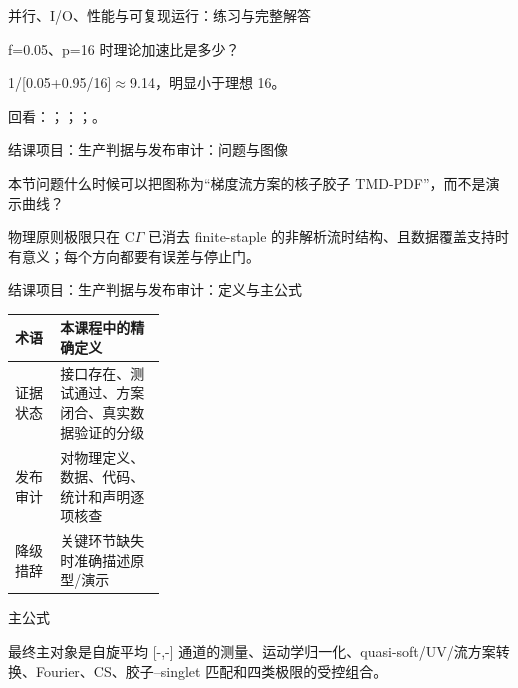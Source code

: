 \begin{frame}[t]{并行、I/\allowbreak{}O、性能与可复现运行：练习与完整解答}
\footnotesize
\begin{block}{}f=0.05、p=16 时理论加速比是多少？\end{block}
\begin{exampleblock}{}1/\allowbreak{}[0.05+0.95/\allowbreak{}16]\ensuremath{\approx}9.14，明显小于理想 16。\end{exampleblock}
\vfill
\scriptsize 回看：；；；。
\end{frame}

\begin{frame}[t]{结课项目：生产判据与发布审计：问题与图像}
\footnotesize
\begin{block}{本节问题}什么时候可以把图称为“梯度流方案的核子胶子 TMD-PDF”，而不是演示曲线？\end{block}
\begin{block}{物理原则}\quad 极限只在 C\ensuremath{\Gamma} 已消去 finite-staple 的非解析流时结构、且数据覆盖支持时有意义；每个方向都要有误差与停止门。\end{block}
\end{frame}

\begin{frame}[t]{结课项目：生产判据与发布审计：定义与主公式}
\footnotesize\begin{tabularx}{\linewidth}{p{0.30\linewidth}Y}
\toprule 术语 & 本课程中的精确定义\\\midrule
{} 证据状态 & 接口存在、测试通过、方案闭合、真实数据验证的分级\\
 发布审计 & 对物理定义、数据、代码、统计和声明逐项核查\\
 降级措辞 & 关键环节缺失时准确描述原型/\allowbreak{}演示\\
\bottomrule\end{tabularx}\vspace{0.15cm}
\begin{block}{ 主公式}\centering{}\end{block}
最终主对象是自旋平均 [-,-] 通道的测量、运动学归一化、quasi-soft/\allowbreak{}UV/\allowbreak{}流方案转换、Fourier、CS、胶子--singlet 匹配和四类极限的受控组合。
\end{frame}

